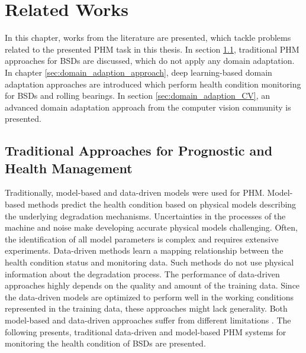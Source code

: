 
\chapter{Related Works}\label{chapter:related_works}
In this chapter, works from the literature are presented, which tackle problems related to the presented PHM task in this thesis. In section \ref{sec:traditional_approaches}, traditional PHM approaches for BSDs are discussed, which do not apply any domain adaptation. In chapter \ref{sec:domain_adaption_approach}, deep learning-based domain adaptation approaches are introduced which perform health condition monitoring for BSDs and rolling bearings. In section \ref{sec:domain_adaption_CV}, an advanced domain adaptation approach from the computer vision community is presented. 

\section{Traditional Approaches for Prognostic and Health Management}\label{sec:traditional_approaches}

Traditionally, model-based and data-driven models were used for PHM. Model-based methods predict the health condition based on physical models describing the underlying degradation mechanisms. Uncertainties in the processes of the machine and noise make developing accurate physical models challenging. Often, the identification of all model parameters is complex and requires extensive experiments. Data-driven methods learn a mapping relationship between the health condition status and monitoring data. Such methods do not use physical information about the degradation process. The performance of data-driven approaches highly depends on the quality and amount of the training data. Since the data-driven models are optimized to perform well in the working conditions represented in the training data, these approaches might lack generality. Both model-based and data-driven approaches suffer from different limitations \cite{DENG2020}. The following presents, traditional data-driven and model-based PHM systems for monitoring the health condition of BSDs are presented.


